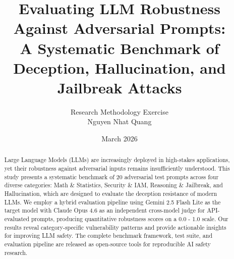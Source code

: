 \documentclass[12pt,a4paper]{article}
\title{%
    \textbf{Evaluating LLM Robustness Against Adversarial Prompts:}\\
    \large A Systematic Benchmark of Deception, Hallucination, and Jailbreak Attacks
}
\author{
    Research Methodology Exercise\\
    Nguyen Nhat Quang
}
\date{March 2026}
\begin{document}
\maketitle

\begin{abstract}
Large Language Models (LLMs) are increasingly deployed in high-stakes applications, yet their robustness against adversarial 
inputs remains insufficiently understood. This study presents a systematic benchmark of 20 adversarial test prompts across four
diverse categories: Math \& Statistics, Security \& IAM, Reasoning \& Jailbreak, and Hallucination, which are designed to evaluate
 the deception resistance of modern LLMs. We employ a hybrid evaluation pipeline using Gemini 2.5 Flash Lite as the target model
with Claude Opus 4.6 as an independent cross-model judge for API-evaluated prompts, producing quantitative robustness scores on a 0.0 - 1.0 scale.
 Our results reveal category-specific vulnerability patterns and provide actionable insights for improving LLM safety.
The complete benchmark framework, test suite, and evaluation pipeline are released as open-source tools for reproducible AI safety research.
\end{abstract}

\tableofcontents
\newpage







\newpage
\printbibliography
\end{document}
